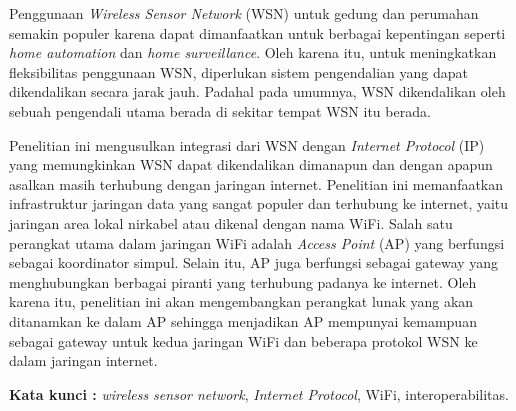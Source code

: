 \documentclass{jtetiskripsi}
\begin{document}
\begin{abstractind}
Penggunaan \emph{Wireless Sensor Network} (WSN) untuk gedung dan perumahan semakin populer karena dapat dimanfaatkan untuk berbagai kepentingan seperti \emph{home automation} dan \emph{home surveillance}. Oleh karena itu, untuk meningkatkan fleksibilitas penggunaan WSN, diperlukan sistem pengendalian yang dapat dikendalikan secara jarak jauh. Padahal pada umumnya, WSN dikendalikan oleh sebuah pengendali utama berada di sekitar tempat WSN itu berada.

Penelitian ini mengusulkan integrasi dari WSN dengan \emph{Internet Protocol} (IP) yang memungkinkan WSN dapat dikendalikan dimanapun dan dengan apapun asalkan masih terhubung dengan jaringan internet. Penelitian ini memanfaatkan infrastruktur jaringan data yang sangat populer dan terhubung ke internet, yaitu jaringan area lokal nirkabel atau dikenal dengan nama WiFi. Salah satu perangkat utama dalam jaringan WiFi adalah \emph{Access Point} (AP) yang berfungsi sebagai koordinator simpul. Selain itu, AP juga berfungsi sebagai gateway yang menghubungkan berbagai piranti yang terhubung padanya ke internet. Oleh karena itu, penelitian ini akan mengembangkan perangkat lunak yang akan ditanamkan ke dalam AP sehingga menjadikan AP mempunyai kemampuan sebagai gateway untuk kedua jaringan WiFi dan beberapa protokol WSN ke dalam jaringan internet.


\bigskip
\noindent
\textbf{Kata kunci :} \emph{wireless sensor network}, \emph{Internet Protocol}, WiFi, interoperabilitas.
\end{abstractind}
\end{document}
